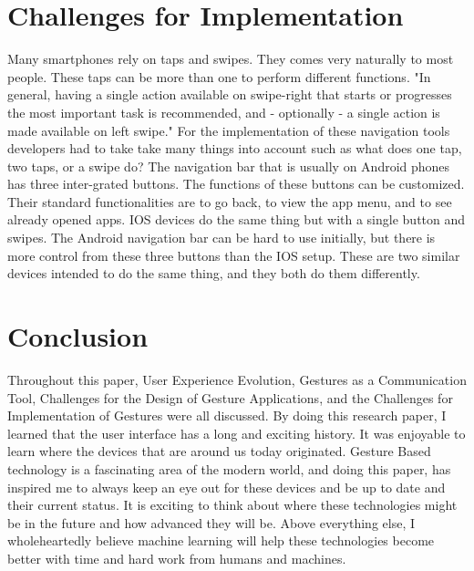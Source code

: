 \documentclass{article}
\begin{document}
\section{Challenges for Implementation}

Many smartphones rely on taps and swipes. They comes very naturally to most people. These taps can be more than one to perform different functions. "In general, having a single action available on swipe-right that starts or progresses the most important task is recommended, and - optionally - a single action is made available on left swipe."
\cite{ref17}
For the implementation of these navigation tools developers had to take take many things into account such as what does one tap, two taps, or a swipe do? The navigation bar that is usually on Android phones has three inter-grated buttons. The functions of these buttons can be customized. Their standard functionalities are to go back, to view the app menu, and to see already opened apps. IOS devices do the same thing but with a single button and swipes. The Android navigation bar can be hard to use initially, but there is more control from these three buttons than the IOS setup. These are two similar devices intended to do the same thing, and they both do them differently.

\section{Conclusion}

Throughout this paper, User Experience Evolution, Gestures as a Communication Tool, Challenges for the Design of Gesture Applications, and the Challenges for Implementation of Gestures were all discussed. By doing this research paper, I learned that the user interface has a long and exciting history. It was enjoyable to learn where the devices that are around us today originated. Gesture Based technology is a fascinating area of the modern world, and doing this paper, has inspired me to always keep an eye out for these devices and be up to date and their current status.
It is exciting to think about where these technologies might be in the future and how advanced they will be. Above everything else, I wholeheartedly believe machine learning will help these technologies become better with time and hard work from humans and machines. 
\end{document}
